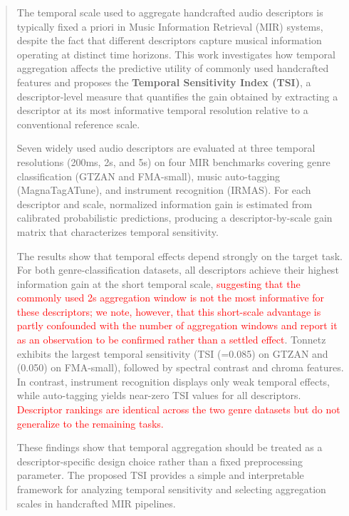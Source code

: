 \documentclass[runningheads]{llncs}
\begin{document}
\begin{abstract}
The temporal scale used to aggregate handcrafted audio descriptors is typically fixed a priori in Music Information Retrieval (MIR) systems, despite the fact that different descriptors capture musical information operating at distinct time horizons. This work investigates how temporal aggregation affects the predictive utility of commonly used handcrafted features and proposes the \textbf{Temporal Sensitivity Index (TSI)}, a descriptor-level measure that quantifies the gain obtained by extracting a descriptor at its most informative temporal resolution relative to a conventional reference scale.

Seven widely used audio descriptors are evaluated at three temporal resolutions (200ms, 2s, and 5s) on four MIR benchmarks covering genre classification (GTZAN and FMA-small), music auto-tagging (MagnaTagATune), and instrument recognition (IRMAS). For each descriptor and scale, normalized information gain is estimated from calibrated probabilistic predictions, producing a descriptor-by-scale gain matrix that characterizes temporal sensitivity.

The results show that temporal effects depend strongly on the target task. For both genre-classification datasets, all descriptors achieve their highest information gain at the short temporal scale, \textcolor{red}{suggesting that the commonly used 2s aggregation window is not the most informative for these descriptors; we note, however, that this short-scale advantage is partly confounded with the number of aggregation windows and report it as an observation to be confirmed rather than a settled effect}. Tonnetz exhibits the largest temporal sensitivity (TSI (=0.085) on GTZAN and (0.050) on FMA-small), followed by spectral contrast and chroma features. In contrast, instrument recognition displays only weak temporal effects, while auto-tagging yields near-zero TSI values for all descriptors. \textcolor{red}{Descriptor rankings are identical across the two genre datasets but do not generalize to the remaining tasks.}

These findings show that temporal aggregation should be treated as a descriptor-specific design choice rather than a fixed preprocessing parameter. The proposed TSI provides a simple and interpretable framework for analyzing temporal sensitivity and selecting aggregation scales in handcrafted MIR pipelines.

\end{abstract}
\end{document}
